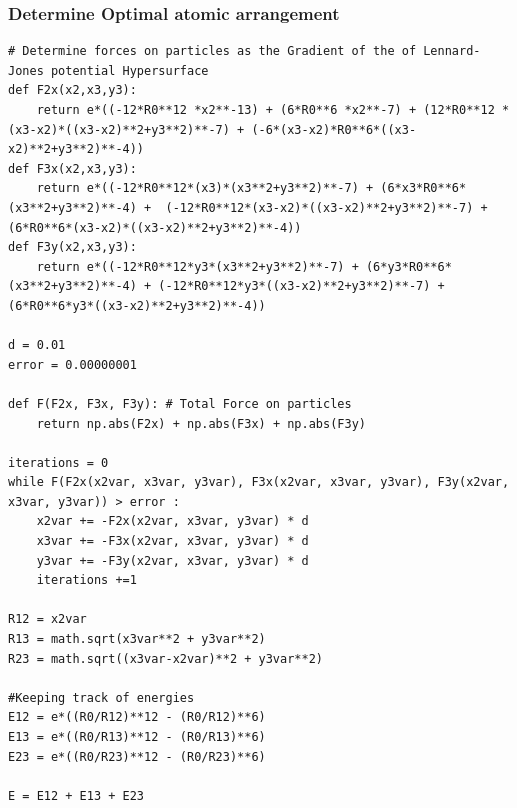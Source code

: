 \documentclass[12pt,a4paper]{article}
\begin{document}
\subsubsection{Determine Optimal atomic arrangement} \label{code:optim}
\begin{lstlisting}
# Determine forces on particles as the Gradient of the of Lennard-Jones potential Hypersurface
def F2x(x2,x3,y3):
    return e*((-12*R0**12 *x2**-13) + (6*R0**6 *x2**-7) + (12*R0**12 *(x3-x2)*((x3-x2)**2+y3**2)**-7) + (-6*(x3-x2)*R0**6*((x3-x2)**2+y3**2)**-4))
def F3x(x2,x3,y3):
    return e*((-12*R0**12*(x3)*(x3**2+y3**2)**-7) + (6*x3*R0**6*(x3**2+y3**2)**-4) +  (-12*R0**12*(x3-x2)*((x3-x2)**2+y3**2)**-7) + (6*R0**6*(x3-x2)*((x3-x2)**2+y3**2)**-4))
def F3y(x2,x3,y3):
    return e*((-12*R0**12*y3*(x3**2+y3**2)**-7) + (6*y3*R0**6*(x3**2+y3**2)**-4) + (-12*R0**12*y3*((x3-x2)**2+y3**2)**-7) + (6*R0**6*y3*((x3-x2)**2+y3**2)**-4))

d = 0.01
error = 0.00000001

def F(F2x, F3x, F3y): # Total Force on particles
    return np.abs(F2x) + np.abs(F3x) + np.abs(F3y)

iterations = 0
while F(F2x(x2var, x3var, y3var), F3x(x2var, x3var, y3var), F3y(x2var, x3var, y3var)) > error :
    x2var += -F2x(x2var, x3var, y3var) * d
    x3var += -F3x(x2var, x3var, y3var) * d
    y3var += -F3y(x2var, x3var, y3var) * d
    iterations +=1

R12 = x2var
R13 = math.sqrt(x3var**2 + y3var**2)
R23 = math.sqrt((x3var-x2var)**2 + y3var**2)

#Keeping track of energies
E12 = e*((R0/R12)**12 - (R0/R12)**6)
E13 = e*((R0/R13)**12 - (R0/R13)**6)
E23 = e*((R0/R23)**12 - (R0/R23)**6)

E = E12 + E13 + E23
\end{lstlisting}
\end{document}
